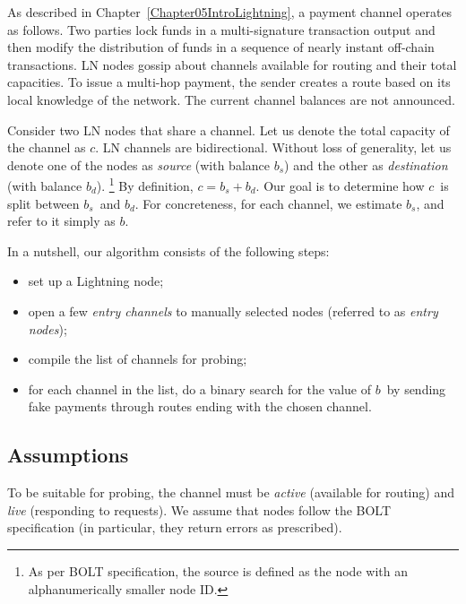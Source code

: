 As described in Chapter~\ref{Chapter05IntroLightning}, a payment channel operates as follows.
Two parties lock funds in a multi-signature transaction output and then modify the distribution of funds in a sequence of nearly instant off-chain transactions.
LN nodes gossip about channels available for routing and their total capacities.
To issue a multi-hop payment, the sender creates a route based on its local knowledge of the network.
The current channel balances are not announced.

Consider two LN nodes that share a channel.
Let us denote the total capacity of the channel as $c$.
LN channels are bidirectional.
Without loss of generality, let us denote one of the nodes as \textit{source} (with balance $b_s$) and the other as \textit{destination} (with balance $b_d$).
\footnote{As per BOLT specification, the source is defined as the node with an alphanumerically smaller node ID.}
By definition, $c = b_s + b_d$.
Our goal is to determine how $c$~is split between $b_s$~and $b_d$.
For concreteness, for each channel, we estimate $b_s$, and refer to it simply as $b$.

In a nutshell, our algorithm consists of the following steps:
\begin{itemize}
	\item set up a Lightning node;
	\item open a few \textit{entry channels} to manually selected nodes (referred to as \textit{entry nodes});
	\item compile the list of channels for probing;
	\item for each channel in the list, do a binary search for the value of $b$~by sending fake payments through routes ending with the chosen channel.
\end{itemize}

\subsection{Assumptions}

To be suitable for probing, the channel must be \textit{active} (available for routing) and \textit{live} (responding to requests).
We assume that nodes follow the BOLT specification (in particular, they return errors as prescribed).

